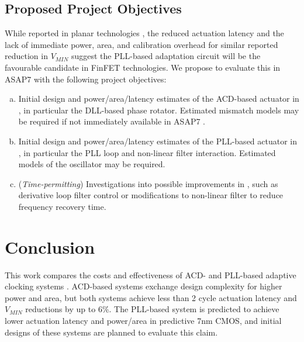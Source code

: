 \documentclass[twoside,9pt,journal,letterpage]{IEEEtran}
\begin{document}
\subsection{Proposed Project Objectives}
\label{sec:proposal}
While reported in planar technologies \cite{hashimoto2018, wilcox2015}, the reduced actuation latency and the lack of immediate power, area, and calibration overhead for similar reported reduction in $V_{MIN}$ suggest the PLL-based adaptation circuit \cite{hashimoto2018} will be the favourable candidate in FinFET technologies. We propose to evaluate this in ASAP7 with the following project objectives:

\begin{enumerate}[(a)]
\item Initial design and power/area/latency estimates of the ACD-based actuator in \cite{wilcox2015}, in particular the DLL-based phase rotator. Estimated mismatch models may be required if not immediately available in ASAP7 \cite{asap7}.
\item Initial design and power/area/latency estimates of the PLL-based actuator in \cite{hashimoto2018}, in particular the PLL loop and non-linear filter interaction. Estimated models of the oscillator may be required.
\item (\textit{Time-permitting}) Investigations into possible improvements in \cite{hashimoto2018}, such as derivative loop filter control or modifications to non-linear filter to reduce frequency recovery time.
\end{enumerate}

\section{Conclusion}
\label{sec:conclusion}

This work compares the costs and effectiveness of ACD- and PLL-based adaptive clocking systems \cite{hashimoto2018,wilcox2015}. ACD-based systems exchange design complexity for higher power and area, but both systems achieve less than 2 cycle actuation latency and $V_{MIN}$ reductions by up to 6\%. The PLL-based system is predicted to achieve lower actuation latency and power/area in predictive 7nm CMOS, and initial designs of these systems are planned to evaluate this claim.



\begingroup
\raggedright

\endgroup
\end{document}
